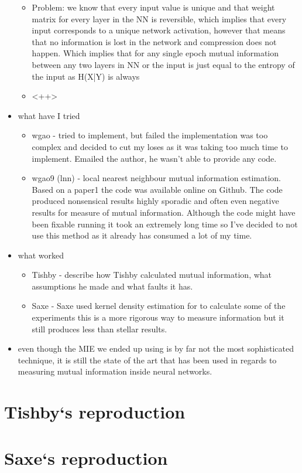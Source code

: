 \begin{itemize}
{\begin{itemize}
{          }
        \item{
            Problem: we know that every input value is unique and that weight
            matrix for every layer in the NN is reversible, which implies that
            every input corresponds to a unique network activation, however that
            means that no information is lost in the network and compression
            does not happen. Which implies that for any single epoch mutual
            information between any two layers in NN or the input is just equal to the entropy of the input as H(X|Y) is always 

          }
        \item{
            <++>
          }
      \end{itemize}



    }
  \item{
      what have I tried
      \begin{itemize}
        \item{
            wgao - tried to implement, but failed the implementation was too
            complex and decided to cut my loses as it was taking too much time
            to implement. Emailed the author, he wasn't able to provide any
            code.
          }
        \item{
            wgao9 (lnn) - local nearest neighbour mutual information estimation.
            Based on a paper1 the code was available online on Github.
            The code produced nonsensical results highly sporadic and often even
            negative results for measure of mutual information. Although the
            code might have been fixable running it took an extremely long time
            so I've decided to not use this method as it already has consumed a
            lot of my time.
          }
      \end{itemize}
    }
  \item{
      what worked
      \begin{itemize}
        \item{
            Tishby - describe how Tishby calculated mutual information, what
            assumptions he made and what faults it has.
          }
        \item{
            Saxe - Saxe used kernel density estimation for to calculate some of
            the experiments this is a more rigorous way to measure information
            but it still produces less than stellar results.
          }
      \end{itemize}
    }
  \item{
      even though the MIE we ended up using is by far not the most sophisticated
      technique, it is still the state of the art that has been used in regards
      to measuring mutual information inside neural networks.
    }
\end{itemize}
    


\section{Tishby`s reproduction}
\section{Saxe`s reproduction}

